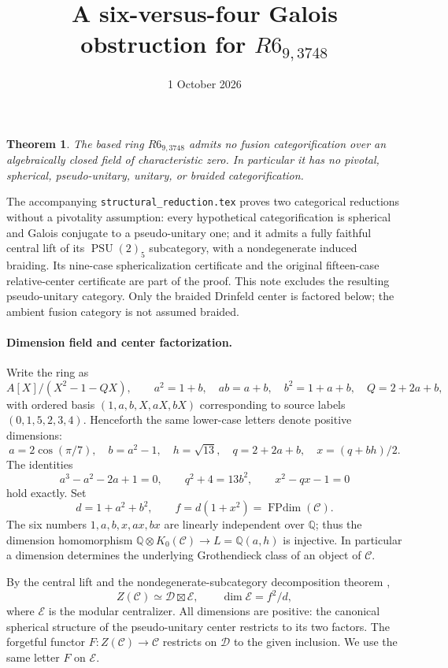 \documentclass[11pt]{article}
\title{A six-versus-four Galois obstruction for $R6_{9,3748}$}
\author{}\date{1 October 2026}
\newtheorem{theorem}{Theorem}
\newcommand{\D}{\mathcal D}
\newcommand{\C}{\mathcal C}
\newcommand{\E}{\mathcal E}
\newcommand{\FP}{\operatorname{FPdim}}
\begin{document}
\maketitle

\begin{theorem}
The based ring $R6_{9,3748}$ admits no fusion categorification over an
algebraically closed field of characteristic zero. In particular it has no
pivotal, spherical, pseudo-unitary, unitary, or braided categorification.
\end{theorem}

The accompanying \texttt{structural\_reduction.tex} proves two categorical
reductions without a pivotality assumption: every hypothetical categorification
is spherical and Galois conjugate to a pseudo-unitary one; and it admits a
fully faithful central lift of its $\operatorname{PSU}(2)_5$ subcategory,
with a nondegenerate induced braiding. Its nine-case sphericalization
certificate and the original fifteen-case relative-center certificate are
part of the proof. This note excludes the resulting pseudo-unitary category.
Only the braided Drinfeld center is factored below; the ambient fusion
category is not assumed braided.

\paragraph{Dimension field and center factorization.}
Write the ring as
\[
 A[X]/(X^2-1-QX),\qquad
 a^2=1+b,\quad ab=a+b,\quad b^2=1+a+b,\quad Q=2+2a+b,
\]
with ordered basis $(1,a,b,X,aX,bX)$ corresponding to source labels
$(0,1,5,2,3,4)$. Henceforth the same lower-case letters denote positive
dimensions:
\[
 a=2\cos(\pi/7),\quad b=a^2-1,\quad h=\sqrt{13},\quad
 q=2+2a+b,\quad x=(q+bh)/2.
\]
The identities
\[
 a^3-a^2-2a+1=0,\qquad q^2+4=13b^2,\qquad x^2-qx-1=0
\]
hold exactly. Set
\[
 d=1+a^2+b^2,\qquad f=d(1+x^2)=\FP(\C).
\]
The six numbers $1,a,b,x,ax,bx$ are linearly independent over $\mathbb Q$;
thus the dimension homomorphism $\mathbb Q\otimes K_0(\C)\to
L=\mathbb Q(a,h)$ is injective. In particular a dimension determines
the underlying Grothendieck class of an object of $\C$.

By the central lift and the nondegenerate-subcategory decomposition theorem
\cite[Theorem 3.13]{DGNO},
\[
 Z(\C)\simeq\D\boxtimes\E,\qquad
 \dim\E=f^2/d,
\]
where $\E$ is the modular centralizer. All dimensions are positive: the
canonical spherical structure of the pseudo-unitary center restricts to its
two factors. The forgetful functor $F:Z(\C)\to\C$ restricts on $\D$
to the given inclusion. We use the same letter $F$ on $\E$.
\end{document}
